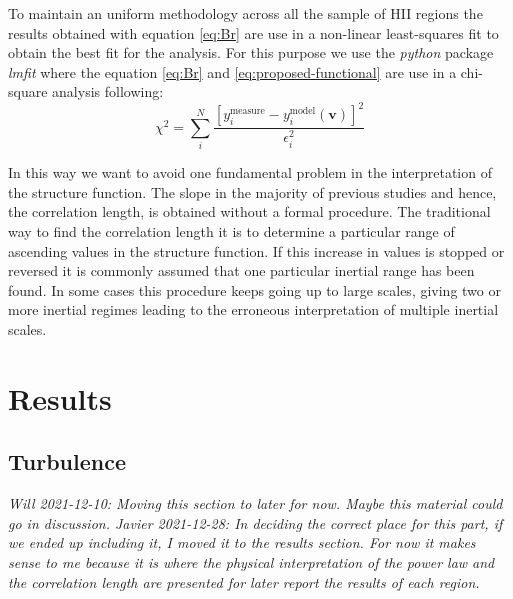 \documentclass[fleqn,usenatbib, useAMS, a4paper]{mnras}
\begin{document}
To maintain an uniform methodology across all the sample of HII regions the results obtained with equation \ref{eq:Br} are use in a non-linear least-squares fit to obtain the best fit for the analysis. 
For this purpose we use the \textit{python} package \textit{lmfit} \citep{newville_matthew_2014_11813} where the equation \ref{eq:Br} and \ref{eq:proposed-functional} are use in a chi-square analysis following:
%
\begin{equation}\label{eq:chi}
  \chi^2 = \sum_i ^N \frac{[y_i^{\text{measure}}-y_i^{\text{model}} (\boldsymbol{v})]^2}{\epsilon_i ^2}
\end{equation}
%

In this way we want to avoid one fundamental problem in the interpretation of the structure function. 
The slope in the majority of previous studies and hence, the correlation length, is obtained without a formal procedure. 
The traditional way to find the correlation length it is to determine a particular range of ascending values in the structure function. 
If this increase in values is stopped or reversed it is commonly assumed that one particular inertial range has been found. 
In some cases this procedure keeps going up to large scales, giving two or more inertial regimes leading to the erroneous interpretation of multiple inertial scales.

\section{Results}\label{sec:results}

\subsection{Turbulence}

\textit{Will 2021-12-10: Moving this section to later for now. Maybe
  this material could go in discussion. Javier 2021-12-28: In deciding the correct place for this part, if we ended up including it, I moved it to the results section. For now it makes sense to me because it is where the physical interpretation of the power law and the correlation length are presented for later report the results of each region.}
\end{document}
